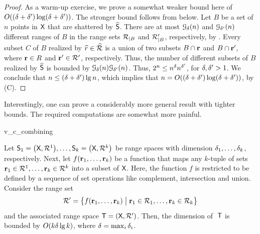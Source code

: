 \begin{proof}
    As a warm-up exercise, we prove a somewhat weaker bound here of
    $O( (\Dim + \DimA) \log \pth{\Dim + \DimA} )$. The stronger bound
    follows from  below.  Let $B$ be a set of
    $n$ points in $\textsf{X}$ that are shattered by
    $\widehat{\mathsf{S}}$. There are at most $\Growth{\Dim}{n }$ and
    $\Growth{\DimA}{n }$ different ranges of $B$ in the range sets
    ${\mathcal{R}}_{|B}$ and $\mathcal{R}'_{|B}$,
    respectively, by . Every subset $C$ of $B$ realized
    by $\widehat{r} \in \widehat{{\mathcal{R}}}$ is a union of two subsets
    $B \cap \mathbf{r}$ and $B \cap \mathbf{r}'$, where $\mathbf{r} \in R$ and
    $\mathbf{r}' \in \mathcal{R}'$, respectively.  Thus, the number of
    different subsets of $B$ realized by $\widehat{\mathsf{S}}$ is
    bounded by $\Growth{\Dim}{n} \Growth{\DimA}{n }$. Thus, $2^n \leq
    n^{\delta} n^{\delta'}$, for $\delta, \delta' > 1$.  We conclude that $n
    \leq (\delta + \delta') \lg n$, which implies that $n = O \pth{
       \pth[]{\Dim + \DimA} \log\pth{ \Dim + \DimA}}$, by
    (C).
\end{proof}


Interestingly, one can prove a considerably more general result with
tighter bounds. The required computations are somewhat more painful.

\begin{fragment}{v_c_combining}
    \begin{theorem}
        Let
        $\RangeSpace_1 = \pth{\GroundSet,\RangeSet^1}, \ldots,
        \RangeSpace_k = \pth{\GroundSet,\RangeSet^k}$
        be range spaces with \VC dimension $\delta_1, \ldots, \delta_k$,
        respectively.  Next, let $f\pth{ \range_1, \ldots, \range_k}$
        be a function that maps any $k$-tuple of sets
        $\mathbf{r}_1 \in {\mathcal{R}}^1, \ldots, \mathbf{r}_k \in {\mathcal{R}}^k$
        into a subset of $\textsf{X}$. Here, the function $f$ is
        restricted to be defined by a sequence of set operations like
        complement, intersection and union.  Consider the range set
        \begin{align*}
          \RangeSetA%
          =%
          \Set{ f\pth{ \range_1, \ldots, \range_k}}{ \range_1
          \in \RangeSet_1, \ldots, \range_k \in \RangeSet_k \bigr.}
        \end{align*}
        and the associated range space $\RangeSpaceA =
        \pth{\GroundSet, \RangeSetA}$. Then, the \VC dimension of
        $\;\mathsf{T}$ is bounded by $O\pth{ k \Dim \lg k}$, where
        $\delta = \max_i \delta_i$.
        
    \end{theorem}
\end{fragment}

